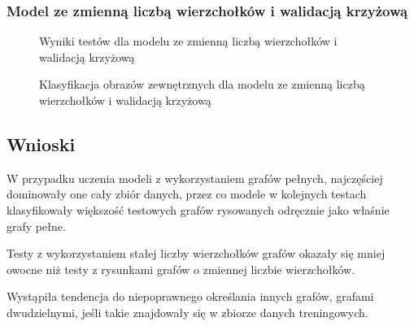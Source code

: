 \subsubsection{Model ze zmienną liczbą wierzchołków i walidacją krzyżową}

\begin{figure}[ht]
	\centering
	\caption{Wyniki testów dla modelu ze zmienną liczbą wierzchołków i walidacją krzyżową}
	\label{Fig:tests-csvar-1}
\end{figure}
\FloatBarrier

\begin{figure}[ht]
	\centering
	\caption{Klasyfikacja obrazów zewnętrznych dla modelu ze zmienną liczbą wierzchołków i walidacją krzyżową}
	\label{Fig:tests-csvar-2}
\end{figure}
\FloatBarrier

\subsection{Wnioski}
W przypadku uczenia modeli z wykorzystaniem grafów pełnych, najczęściej dominowały one cały zbiór danych,
przez co modele w kolejnych testach klasyfikowały większość testowych grafów rysowanych odręcznie jako właśnie grafy pełne.

Testy z wykorzystaniem stałej liczby wierzchołków grafów okazały się mniej owocne niż testy z rysunkami grafów
o zmiennej liczbie wierzchołków.

Wystąpiła tendencja do niepoprawnego określania innych grafów, grafami dwudzielnymi, jeśli takie znajdowały się
w zbiorze danych treningowych.